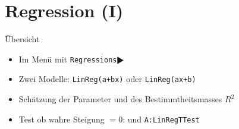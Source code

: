 \documentclass{beamer}
\newlength{\tikey}
\newcommand{\keystroke}[1]{\settowidth{\tikey}{\scriptsize #1}\psframebox[framearc=0.2]{\parbox{\tikey}{\scriptsize #1}}}
\begin{document}
%
%

\section{Regression (I)}
\begin{frame}{Übersicht}
\begin{itemize}
\item Im Menü \keystroke{F4} mit \texttt{Regressions$\RHD$}
\item Zwei Modelle: \texttt{LinReg(a+bx)} oder \texttt{LinReg(ax+b)}
\item Schätzung der Parameter und des Bestimmtheitsmasses $R^2$
\item Test ob wahre Steigung $= 0$: \keystroke{F6} und \texttt{A:LinRegTTest}
\end{itemize}
\end{frame}
\end{document}
